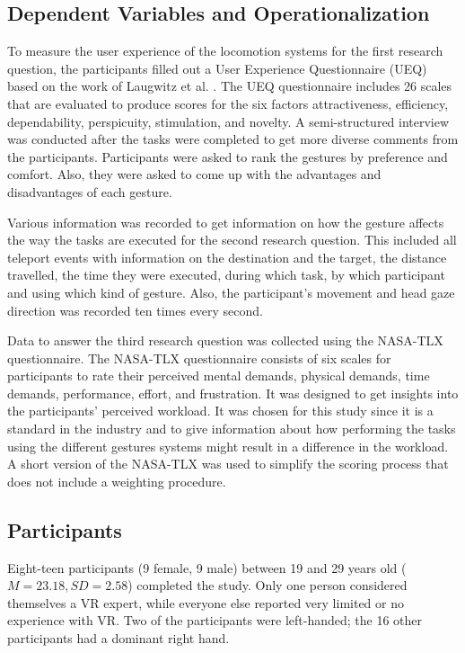 \subsection{Dependent Variables and Operationalization}
To measure the user experience of the locomotion systems for the first research question, the participants filled out a User Experience Questionnaire (UEQ) based on the work of Laugwitz et al. \cite{Laugwitz2008}. The UEQ questionnaire includes 26 scales that are evaluated to produce scores for the six factors attractiveness, efficiency, dependability, perspicuity, stimulation, and novelty. 
A semi-structured interview was conducted after the tasks were completed to get more diverse comments from the participants. Participants were asked to rank the gestures by preference and comfort. Also, they were asked to come up with the advantages and disadvantages of each gesture.

Various information was recorded to get information on how the gesture affects the way the tasks are executed for the second research question. This included all teleport events with information on the destination and the target, the distance travelled, the time they were executed, during which task, by which participant and using which kind of gesture. Also, the participant's movement and head gaze direction was recorded ten times every second.  

Data to answer the third research question was collected using the NASA-TLX questionnaire. %
The NASA-TLX questionnaire consists of six scales for participants to rate their perceived mental demands, physical demands, time demands, performance, effort, and frustration. It was designed to get insights into the participants' perceived workload. It was chosen for this study since it is a standard in the industry and to give information about how performing the tasks using the different gestures systems might result in a difference in the workload. A short version of the NASA-TLX was used to simplify the scoring process that does not include a weighting procedure. %

\subsection{Participants}
Eight-teen participants (9 female, 9 male) between 19 and 29 years old ($M=23.18,SD=2.58$) completed the study. Only one person considered themselves a VR expert, while everyone else reported very limited or no experience with VR. Two of the participants were left-handed; the 16 other participants had a dominant right hand. 


